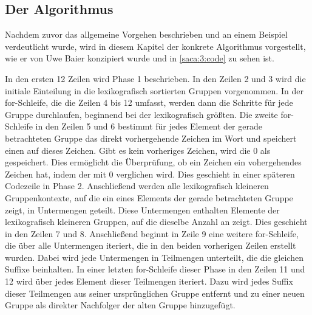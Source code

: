\newpage
\subsection{Der Algorithmus}
\label{gsaca:chapter4}
%
Nachdem zuvor das allgemeine Vorgehen beschrieben und an einem Beispiel verdeutlicht wurde, wird in diesem Kapitel der konkrete Algorithmus vorgestellt, wie er von Uwe Baier konzipiert wurde und in \ref{saca:3:code} zu sehen ist. 

In den ersten 12 Zeilen wird Phase 1 beschrieben. 
In den Zeilen 2 und 3 wird die initiale Einteilung in die lexikografisch sortierten Gruppen vorgenommen. 
In der for-Schleife, die die Zeilen 4 bis 12 umfasst, werden dann die Schritte für jede Gruppe durchlaufen, beginnend bei der lexikografisch größten. 
Die zweite for-Schleife in den Zeilen 5 und 6 bestimmt für jedes Element der gerade betrachteten Gruppe das direkt vorhergehende Zeichen im Wort und speichert einen \prevpointer auf dieses Zeichen. 
Gibt es kein vorheriges Zeichen, wird die 0 als \prevpointer gespeichert. 
Dies ermöglicht die Überprüfung, ob ein Zeichen ein vohergehendes Zeichen hat, indem der \prevpointer mit 0 verglichen wird. 
Dies geschieht in einer späteren Codezeile in Phase 2. 
Anschließend werden alle lexikografisch kleineren Gruppenkontexte, auf die ein \prevpointer eines Elements der gerade betrachteten Gruppe zeigt, in Untermengen geteilt. 
Diese Untermengen enthalten Elemente der lexikografisch kleineren Gruppen, auf die dieselbe Anzahl an \prevpointern zeigt.
Dies geschieht in den Zeilen 7 und 8. 
Anschließend beginnt in Zeile 9 eine weitere for-Schleife, die über alle Untermengen iteriert, die in den beiden vorherigen Zeilen erstellt wurden. 
Dabei wird jede Untermengen in Teilmengen unterteilt, die die gleichen Suffixe beinhalten. 
In einer letzten for-Schleife dieser Phase in den Zeilen 11 und 12 wird über jedes Element dieser Teilmengen iteriert. 
Dazu wird jedes Suffix dieser Teilmengen aus seiner ursprünglichen Gruppe entfernt und zu einer neuen Gruppe als direkter Nachfolger der alten Gruppe hinzugefügt.

